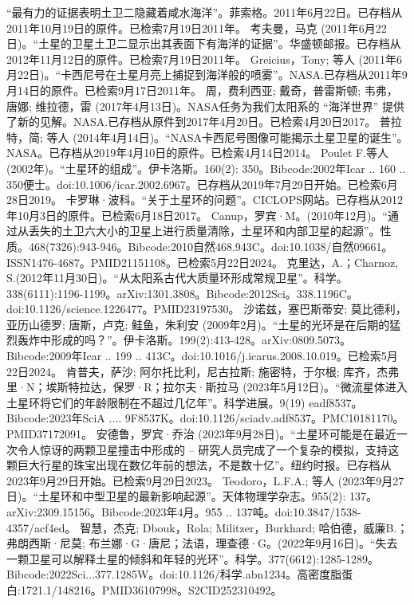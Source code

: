 \begin{enumerate}
 “最有力的证据表明土卫二隐藏着咸水海洋”。菲索格。2011年6月22日。已存档从2011年10月19日的原件。已检索7月19日2011年。
 考夫曼，马克 (2011年6月22日)。“土星的卫星土卫二显示出其表面下有海洋的证据”。华盛顿邮报。已存档从2012年11月12日的原件。已检索7月19日2011年。
 Greicius，Tony; 等人 (2011年6月22日)。“卡西尼号在土星月亮上捕捉到海洋般的喷雾”。NASA.已存档从2011年9月14日的原件。已检索9月17日2011年。
 周，费利西亚; 戴奇，普雷斯顿; 韦弗，唐娜; 维拉德，雷 (2017年4月13日)。NASA任务为我们太阳系的 “海洋世界” 提供了新的见解。NASA.已存档从原件到2017年4月20日。已检索4月20日2017。
 普拉特，简; 等人 (2014年4月14日)。“NASA卡西尼号图像可能揭示土星卫星的诞生”。NASA。已存档从2019年4月10日的原件。已检索4月14日2014。
 Poulet F.等人 (2002年)。“土星环的组成”。伊卡洛斯。160(2): 350。Bibcode:2002年Icar .. 160 .. 350便士。doi:10.1006/icar.2002.6967。已存档从2019年7月29日开始。已检索6月28日2019。
 卡罗琳·波科。“关于土星环的问题”。CICLOPS网站。已存档从2012年10月3日的原件。已检索6月18日2017。
 Canup，罗宾·M。(2010年12月)。“通过从丢失的土卫六大小的卫星上进行质量清除，土星环和内部卫星的起源”。性质。468(7326):943-946。Bibcode:2010自然468.943C。doi:10.1038/自然09661。ISSN1476-4687。PMID21151108。已检索5月22日2024。  
 克里达，A.；Charnoz, S.(2012年11月30日)。“从太阳系古代大质量环形成常规卫星”。科学。338(6111):1196-1199。arXiv:1301.3808。Bibcode:2012Sci。338.1196C。doi:10.1126/science.1226477。PMID23197530。 
 沙诺兹，塞巴斯蒂安; 莫比德利，亚历山德罗; 唐斯，卢克; 鲑鱼，朱利安 (2009年2月)。“土星的光环是在后期的猛烈轰炸中形成的吗？”。伊卡洛斯。199(2):413-428。arXiv:0809.5073。Bibcode:2009年Icar .. 199 .. 413C。doi:10.1016/j.icarus.2008.10.019。已检索5月22日2024。
 肯普夫，萨沙; 阿尔托比利，尼古拉斯; 施密特，于尔根; 库齐，杰弗里·N；埃斯特拉达，保罗·R；拉尔夫·斯拉马 (2023年5月12日)。“微流星体进入土星环将它们的年龄限制在不超过几亿年”。科学进展。9(19) eadf8537。Bibcode:2023年SciA .... 9F8537K。doi:10.1126/sciadv.adf8537。PMC10181170。PMID37172091。  
 安德鲁，罗宾·乔治 (2023年9月28日)。“土星环可能是在最近一次令人惊讶的两颗卫星撞击中形成的 -- 研究人员完成了一个复杂的模拟，支持这颗巨大行星的珠宝出现在数亿年前的想法，不是数十亿”。纽约时报。已存档从2023年9月29日开始。已检索9月29日2023。
 Teodoro，L.F.A.; 等人 (2023年9月27日)。“土星环和中型卫星的最新影响起源”。天体物理学杂志。955(2): 137。arXiv:2309.15156。Bibcode:2023年4月。955 .. 137吨。doi:10.3847/1538-4357/acf4ed。
 智慧，杰克; Dbouk，Rola; Militzer，Burkhard; 哈伯德，威廉B.；弗朗西斯·尼莫; 布兰娜·G·唐尼；法语，理查德·G。(2022年9月16日)。“失去一颗卫星可以解释土星的倾斜和年轻的光环”。科学。377(6612):1285-1289。Bibcode:2022Sci...377.1285W。doi:10.1126/科学.abn1234。高密度脂蛋白:1721.1/148216。PMID36107998。S2CID252310492。  

\end{enumerate}

